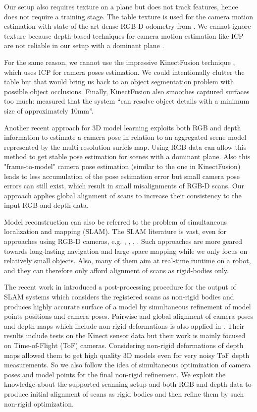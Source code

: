 \documentclass[letterpaper, 10 pt, conference]{ieeeconf}  %
\begin{document}
Our setup also requires 
texture on a plane but does not track features, hence does not require a training stage.
The table texture is used for the camera motion estimation 
with state-of-the-art dense RGB-D odometry from \cite{steinbrucker2011real}.
We cannot ignore texture because depth-based
techniques for camera motion estimation like ICP \cite{besl1992method} 
are not reliable in our setup with a dominant plane \cite{rusinkiewicz2001efficient}.


For the same reason, we cannot use
the impressive KinectFusion technique \cite{newcombe2011kinectfusion},
which uses ICP for camera poses estimation.
We could intentionally clutter the table but that would bring us back to
an object segmentation problem with possible object occlusions.
Finally, KinectFusion also smoothes captured surfaces too much: \cite{meister2012when} measured that
the system ``can resolve object details with a minimum size of approximately 10mm''.

Another recent approach \cite{stuckler2012model} for 3D model learning 
exploits both RGB and depth information to estimate a camera pose 
in relation to an aggregated scene model represented by the multi-resolution surfels map.
Using RGB data can allow this method to get stable pose estimation
for scenes with a dominant plane. Also this "frame-to-model" camera pose estimation (similar to the one in 
KinectFusion) leads to less accumulation of the pose estimation error
but small camera pose errors can still exist, which result in
small misalignments of RGB-D scans. Our approach applies global alignment of scans
to increase their consistency to the input RGB and depth data.

Model reconstruction can also be referred to the problem of simultaneous localization
and mapping (SLAM). The SLAM literature is vast, even for approaches using RGB-D
cameras, e.g. \cite{stuckler2012integrating},
\cite{endres2012evaluation}, \cite{henry2012rgb}, \cite{strasdat2011double}. Such approaches are more geared
towards long-lasting navigation and large space mapping while we only focus on relatively small objects.
Also, many of them aim at
real-time runtime on a robot, and they can therefore only afford alignment of scans 
as rigid-bodies only. 

The recent work in \cite{ruhnke2012highly} introduced a post-processing procedure for the output of SLAM systems
which considers the registered scans as non-rigid bodies and produces highly accurate
surface of a model by simultaneous refinement of model points positions and camera poses.
Pairwise and global alignment of camera poses and depth maps which include non-rigid 
deformations is also applied in \cite{cui2012algorithms}. Their results include tests on the Kinect
sensor data but their work is mainly focused on Time-of-Flight (ToF) cameras. Considering non-rigid deformations 
of depth maps allowed them to get high quality 3D models even for very noisy ToF depth measurements.
So we also follow the idea of simultaneous optimization of camera poses and model points 
for the final non-rigid refinement. We exploit the knowledge 
about the supported scanning setup and both RGB and depth 
data to produce initial alignment of scans as rigid bodies
and then refine them by such non-rigid optimization.
\end{document}
